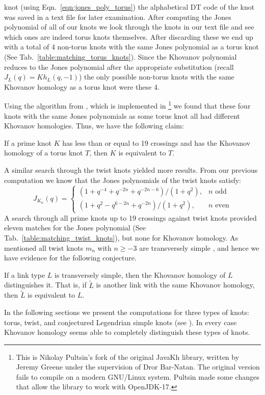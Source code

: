 knot (using Eqn.~\ref{eqn:jones_poly_torus}) the alphabetical DT code of the
knot was saved in a text file for later examination. After computing the Jones
polynomial of all of our knots we look through the knots in our text file and
see which ones are indeed torus knots themselves. After discarding these
we end up with a total of 4 non-torus knots with the same Jones polynomial as a
torus knot (See Tab.~\ref{table:matching_torus_knots}).
Since the Khovanov polynomial reduces to the Jones polynomial after the
appropriate substitution
(recall $J_{L}(q)=Kh_{L}(q,-1)$) the only possible non-torus knots with
the same Khovanov homology as a torus knot were these 4.
\par\hfill\par
Using the algorithm from \cite{BarNatan2006FASTKH}, which is implemented in
\cite{JavaKhv2}\footnote{
    This is Nikolay Pultsin's fork of the original JavaKh library, written by
    Jeremy Greene under the supervision of Dror Bar-Natan. The original version
    fails to compile on a modern GNU/Linux system. Pultsin made some changes
    that allow the library to work with OpenJDK-17.
}
we found that these four knots with the same Jones polynomials as some
torus knot all had different Khovanov homologies. Thus, we have the
following claim:
\begin{theorem}
    If a prime knot $K$ has less than or equal to 19 crossings and has
    the Khovanov homology of a torus knot $T$,
    then $K$ is equivalent to $T$.
\end{theorem}
A similar search through the twist knots yielded more results.
From our previous computation we know that the Jones polynomials of the twist
knots satisfy:
\begin{equation}
    J_{K_{n}}(q)=
    \begin{cases}
        (1+q^{-4}+q^{-2n}+q^{-2n-6})/(1+q^{2}),&n\textrm{ odd}\\
        (1+q^{2}-q^{6-2n}+q^{-2n})/(1+q^{2}),&n\textrm{ even}
    \end{cases}
\end{equation}
A search through all prime knots up to 19 crossings against twist knots
provided eleven matches for the Jones polynomial
(See Tab.~\ref{table:matching_twist_knots}), but
none for Khovanov homology. As mentioned all twist knots $m_{n}$ with
$n\geq{-3}$ are transversely simple
\cite{EtnyreEtAlLegendrianAndTransverseTwistKnots}, and hence we have evidence
for the following conjecture.
\begin{conjecture}
    If a link type $L$ is transversely simple, then the Khovanov
    homology of $L$ distinguishes it. That is, if $\tilde{L}$
    is another link with the same Khovanov homology, then $\tilde{L}$ is
    equivalent to $L$.
\end{conjecture}
In the following sections we present the computations for three types of knots:
torus, twist, and conjectured Legendrian simple knots
(see \cite{LegendrianKnotAtlas}). In every case Khovanov
homology seems able to completely distinguish these types of knots.
